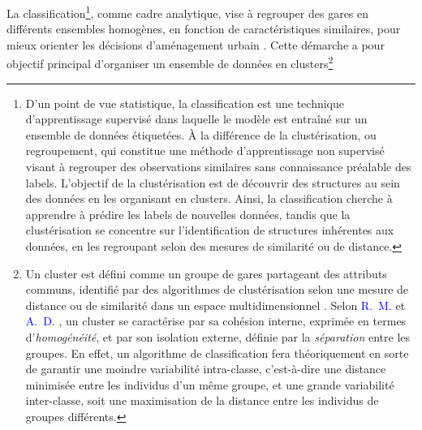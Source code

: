 \begin{refsegment}
La classification\footnote{
    D'un point de vue statistique, la classification est une technique d'apprentissage supervisé dans laquelle le modèle est entraîné sur un ensemble de données étiquetées. À la différence de la clustérisation, ou regroupement, qui constitue une méthode d'apprentissage non supervisé visant à regrouper des observations similaires sans connaissance préalable des labels. L'objectif de la clustérisation est de découvrir des structures au sein des données en les organisant en clusters. Ainsi, la classification cherche à apprendre à prédire les labels de nouvelles données, tandis que la clustérisation se concentre sur l'identification de structures inhérentes aux données, en les regroupant selon des mesures de similarité ou de distance.
}, comme cadre analytique, vise à regrouper des gares en différents ensembles homogènes, en fonction de caractéristiques similaires, pour mieux orienter les décisions d'aménagement urbain \textcolor{blue}{\autocite[2]{cao_coordination_2020}}. Cette démarche a pour objectif principal d'organiser un ensemble de données en clusters\footnote{
    Un cluster est défini comme un groupe de gares partageant des attributs communs, identifié par des algorithmes de clustérisation selon une mesure de distance ou de similarité dans un espace multidimensionnel \textcolor{blue}{\autocite[7]{everitt_cluster_2011}}. Selon \textcolor{blue}{R.~M.} \textcolor{blue}{\textcite[321]{cormack_review_1971}} et \textcolor{blue}{A.~D.} \textcolor{blue}{\textcite[15]{gordon_classification_1999}}, un cluster se caractérise par sa cohésion interne, exprimée en termes d'\textsl{homogénéité}, et par son isolation externe, définie par la \textsl{séparation} entre les groupes. En effet, un algorithme de classification fera théoriquement en sorte de garantir une moindre variabilité intra-classe, c'est-à-dire une distance minimisée entre les individus d'un même groupe, et une grande variabilité inter-classe, soit une maximisation de la distance entre les individus de groupes différents.
}
\end{refsegment}
